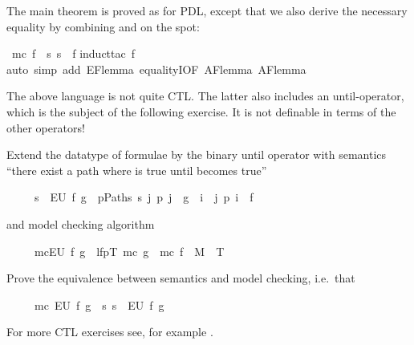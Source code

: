 \begin{isabellebody}
\begin{isamarkuptext}
The main theorem is proved as for PDL, except that we also derive the
necessary equality  by combining
 and  on the spot:%
\end{isamarkuptext}%
\ {\isachardoublequote}mc\ f\ {\isacharequal}\ {\isacharbraceleft}s{\isachardot}\ s\ {\isasymTurnstile}\ f{\isacharbraceright}{\isachardoublequote}\isanewline
{}induct{\isacharunderscore}tac\ f{\isacharparenright}\isanewline
{}auto\ simp\ add{\isacharcolon}\ EF{\isacharunderscore}lemma\ equalityI{\isacharbrackleft}OF\ AF{\isacharunderscore}lemma{}\ AF{\isacharunderscore}lemma{}{\isacharbrackright}{\isacharparenright}\isanewline
{}%
\begin{isamarkuptext}%
The above language is not quite CTL. The latter also includes an
until-operator, which is the subject of the following exercise.
It is not definable in terms of the other operators!
\begin{exercise}
Extend the datatype of formulae by the binary until operator  with semantics
``there exist a path where  is true until  becomes true''
\begin{isabelle}%
\ \ \ \ \ s\ {\isasymTurnstile}\ EU\ f\ g\ {\isacharequal}\ {\isacharparenleft}{\isasymexists}p{\isasymin}Paths\ s{\isachardot}\ {\isasymexists}j{\isachardot}\ p\ j\ {\isasymTurnstile}\ g\ {\isasymand}\ {\isacharparenleft}{\isasymexists}i\ {\isacharless}\ j{\isachardot}\ p\ i\ {\isasymTurnstile}\ f{\isacharparenright}{\isacharparenright}%
\end{isabelle}
and model checking algorithm
\begin{isabelle}%
\ \ \ \ \ mc{\isacharparenleft}EU\ f\ g{\isacharparenright}\ {\isacharequal}\ lfp{\isacharparenleft}{\isasymlambda}T{\isachardot}\ mc\ g\ {\isasymunion}\ mc\ f\ {\isasyminter}\ {\isacharparenleft}M{\isacharcircum}{\isacharminus}{}\ {\isacharcircum}{\isacharcircum}\ T{\isacharparenright}{\isacharparenright}%
\end{isabelle}
Prove the equivalence between semantics and model checking, i.e.\ that
\begin{isabelle}%
\ \ \ \ \ mc\ {\isacharparenleft}EU\ f\ g{\isacharparenright}\ {\isacharequal}\ {\isacharbraceleft}s{\isachardot}\ s\ {\isasymTurnstile}\ EU\ f\ g{\isacharbraceright}%
\end{isabelle}
\end{exercise}
For more CTL exercises see, for example \cite{Huth-Ryan-book}.
\bigskip


\end{isamarkuptext}
\end{isabellebody}
